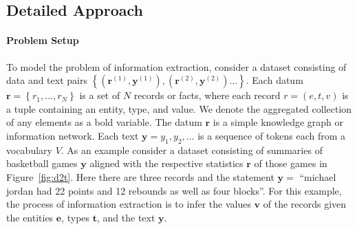\documentclass[12pt]{article}
\newcommand\set[1]{\left\{#1\right\}}
\newcommand{\ba}{\mathbf{a}}
\newcommand{\be}{\mathbf{e}}
\newcommand{\br}{\mathbf{r}}
\newcommand{\bt}{\mathbf{t}}
\newcommand{\bv}{\mathbf{v}}
\newcommand{\by}{\mathbf{y}}
\begin{document}








\subsection*{Detailed Approach}


\paragraph{Problem Setup}
To model the problem of information extraction,  
consider a dataset consisting of data and text pairs
$\set{(\br^{(1)}, \by^{(1)}),(\br^{(2)},\by^{(2)})\ldots}$.
Each datum $\br = \set{r_1,\ldots,r_N}$ is a set of $N$ records or facts, where each record $r = (e, t, v)$
is a tuple containing an entity, type, and value.
We denote the aggregated collection of any elements as a bold variable.
The datum $\br$ is a simple knowledge graph or information network. 
Each text $\by = y_1,y_2,\ldots$ is a sequence of tokens each from a vocabulary $V$. As an example consider a dataset consisting of summaries of basketball games $\by$ aligned with the respective statistics $\br$ of those games in Figure~\ref{fig:d2t}. 
Here there are three records and the statement $\by = $ ``michael jordan had 22 points and 12 rebounds as well as four blocks''. For this example, the process of information extraction is to infer 
the values $\bv$ of the records given the entities $\be$, types $\bt$, and the text $\by$.
\end{document}
